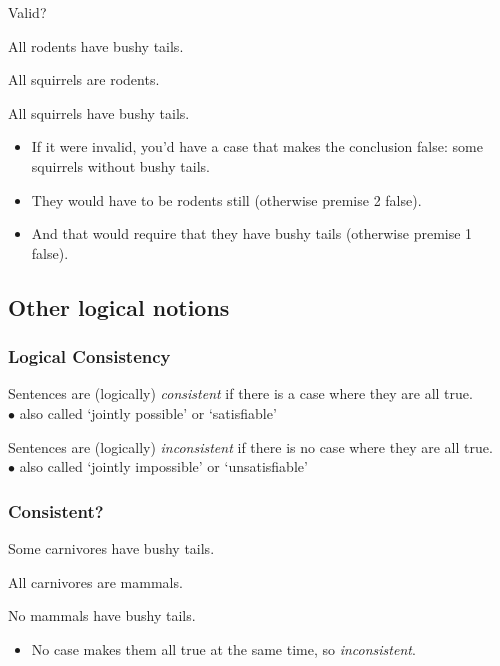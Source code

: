 \begin{frame}{Valid?}
  \begin{earg}
    \item[] All rodents have bushy tails.
    \item[] All squirrels are rodents.
    \item[\therefore] All squirrels have bushy tails.
  \end{earg}
\pause
  \begin{itemize}[<+->]
    \item If it were invalid, you'd have a case that makes the
    conclusion false: some squirrels without bushy tails.
    \item They would have to be rodents still (otherwise premise 2 false).
    \item And that would require that they have bushy tails (otherwise premise 1 false).
  \end{itemize}
\end{frame}

\subsection{Other logical notions}

\begin{frame}
  \frametitle{Logical Consistency}

  \begin{definition}
  Sentences are (logically) \emph{consistent} if there is a case where they
  are all true. \\ $\bullet$ also called `jointly possible' or `satisfiable' 
  \end{definition}

  \begin{definition}
    Sentences are (logically) \emph{inconsistent} if there is no case where they
    are all true. \\ $\bullet$ also called `jointly impossible' or `unsatisfiable' 
    \end{definition}
\end{frame}


\begin{frame}
  \frametitle{Consistent?}
  \begin{earg}
    \item[] Some carnivores have bushy tails.
    \item[] All carnivores are mammals. 
    \item[] No mammals have bushy tails.
  \end{earg}

  \begin{itemize}
    \item<2> No case makes them all true at the same time, so
    \emph{inconsistent}.
  \end{itemize}
\end{frame}

